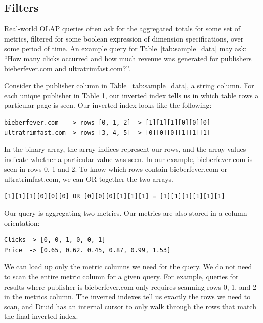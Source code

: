 \documentclass{vldb}
\begin{document}
\subsection{Filters}

Real-world OLAP queries often ask for the aggregated totals for some set of
metrics, filtered for some boolean expression of dimension specifications, over
some period of time. An example query for Table~\ref{tab:sample_data} may ask:
“How many clicks occurred and how much revenue was generated for publishers
bieberfever.com and ultratrimfast.com?”. 

Consider the publisher column in Table~\ref{tab:sample_data}, a string column.
For each unique publisher in Table 1, our inverted index tells us in which
table rows a particular page is seen. Our inverted index looks like the
following:

{\small\begin{verbatim}
bieberfever.com   -> rows [0, 1, 2] -> [1][1][1][0][0][0]
ultratrimfast.com -> rows [3, 4, 5] -> [0][0][0][1][1][1]
\end{verbatim}}

In the binary array, the array indices represent our rows, and the array values
indicate whether a particular value was seen. In our example, bieberfever.com
is seen in rows 0, 1 and 2. To know which rows contain bieberfever.com or
ultratrimfast.com, we can OR together the two arrays.

{\small\begin{verbatim}
[1][1][1][0][0][0] OR [0][0][0][1][1][1] = [1][1][1][1][1][1]
\end{verbatim}}

Our query is aggregating two metrics. Our metrics are also stored in a column
orientation:

{\small\begin{verbatim}
Clicks -> [0, 0, 1, 0, 0, 1]
Price  -> [0.65, 0.62. 0.45, 0.87, 0.99, 1.53]
\end{verbatim}}

We can load up only the metric columns we need for the query. We do not
need to scan the entire metric column for a given query. For example, queries
for results where publisher is bieberfever.com only requires scanning rows 0,
1, and 2 in the metrics column. The inverted indexes tell us exactly the rows
we need to scan, and Druid has an internal cursor to only walk through the rows
that match the final inverted index.
\end{document}
